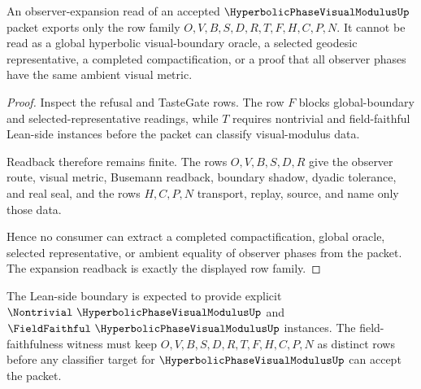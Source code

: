 \begin{theorem}
\label{thm:hyperbolic-phase-visual-modulus-expansion-readback}
An observer-expansion read of an accepted $\HyperbolicPhaseVisualModulusUp$ packet exports only the row family $O,V,B,S,D,R,T,F,H,C,P,N$. It cannot be read as a global hyperbolic visual-boundary oracle, a selected geodesic representative, a completed compactification, or a proof that all observer phases have the same ambient visual metric.
\end{theorem}
\begin{proof}
Inspect the refusal and TasteGate rows. The row $F$ blocks global-boundary and selected-representative readings, while $T$ requires nontrivial and field-faithful Lean-side instances before the packet can classify visual-modulus data.

Readback therefore remains finite. The rows $O,V,B,S,D,R$ give the observer route, visual metric, Busemann readback, boundary shadow, dyadic tolerance, and real seal, and the rows $H,C,P,N$ transport, replay, source, and name only those data.

Hence no consumer can extract a completed compactification, global oracle, selected representative, or ambient equality of observer phases from the packet. The expansion readback is exactly the displayed row family.
\end{proof}



The Lean-side boundary is expected to provide explicit $\Nontrivial\ \HyperbolicPhaseVisualModulusUp$ and $\FieldFaithful\ \HyperbolicPhaseVisualModulusUp$ instances. The field-faithfulness witness must keep $O,V,B,S,D,R,T,F,H,C,P,N$ as distinct rows before any classifier target for $\HyperbolicPhaseVisualModulusUp$ can accept the packet.


